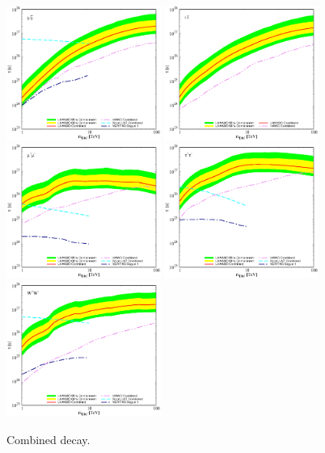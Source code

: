 \documentclass[aps,prd,amsmath,amssymb,showpacs,floats,floatfix,nofootinbib,reprint]{revtex4-1}
\begin{document}
\begin{figure}%
\caption{Combined decay.}
{\includegraphics[width=0.45\textwidth]{decay_combined_bottom.eps}}
{\includegraphics[width=0.45\textwidth]{decay_combined_top.eps}}
{\includegraphics[width=0.45\textwidth]{decay_combined_mu.eps}}
{\includegraphics[width=0.45\textwidth]{decay_combined_tau.eps}}
{\includegraphics[width=0.45\textwidth]{decay_combined_ww.eps}}
\end{figure}
\end{document}
